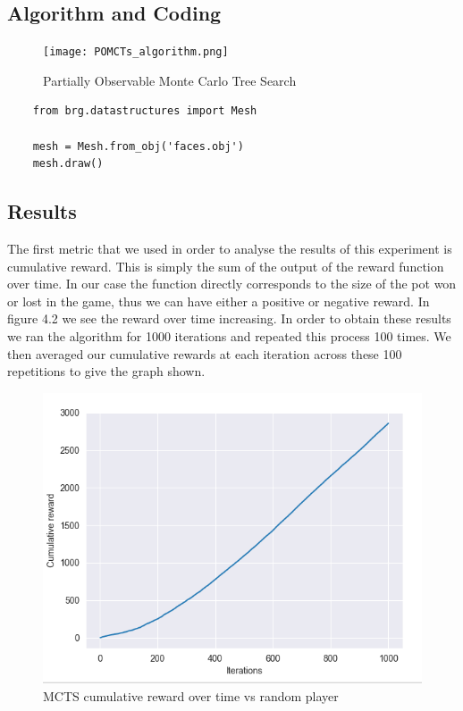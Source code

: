 \subsection{Algorithm and Coding}\label{subsec:algAndCoding1}


\begin{figure}
    \texttt{[image: POMCTs\_algorithm.png]}
    \caption{Partially Observable Monte Carlo Tree Search}
\end{figure}

\lstset{language=Python}
\lstset{frame=lines}
\lstset{basicstyle=\footnotesize}
\begin{lstlisting}
    from brg.datastructures import Mesh

    mesh = Mesh.from_obj('faces.obj')
    mesh.draw()
\end{lstlisting}

\subsection{Results}\label{subsec:results1}
The first metric that we used in order to analyse the results of this experiment is cumulative reward.
This is simply the sum of the output of the reward function over time.
In our case the function directly corresponds to the size of the pot won or lost in the game,
thus we can have either a positive or negative reward.
In figure 4.2 we see the reward over time increasing.
In order to obtain these results we ran the algorithm for 1000 iterations and repeated this process 100 times.
We then averaged our cumulative rewards at each iteration across these 100 repetitions to give the graph shown.

\begin{figure}
    \includegraphics[scale=.5]{images/cumulative_reward_mcts_vs_random.png}
    \caption{MCTS cumulative reward over time vs random player}
\end{figure}


